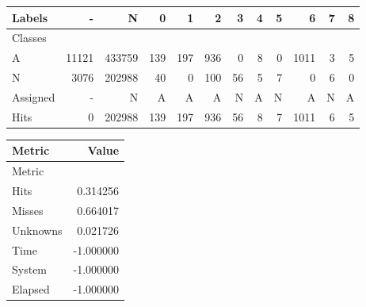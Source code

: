 \begin{tabular}{l|r|r|r|r|r|r|r|r|r|r|r}

Labels &      - &       N &    0 &    1 &    2 &   3 &  4 &  5 &     6 &  7 &  8 \\\hline
Classes  &        &         &      &      &      &     &    &    &       &    &    \\\hline
\hline
A        &  11121 &  433759 &  139 &  197 &  936 &   0 &  8 &  0 &  1011 &  3 &  5 \\\hline
N        &   3076 &  202988 &   40 &    0 &  100 &  56 &  5 &  7 &     0 &  6 &  0 \\\hline
\hline
Assigned &      - &       N &    A &    A &    A &   N &  A &  N &     A &  N &  A \\\hline
Hits     &      0 &  202988 &  139 &  197 &  936 &  56 &  8 &  7 &  1011 &  6 &  5 
\end{tabular}
\begin{tabular}{l|r}

Metric   &     Value \\\hline
Metric   &           \\\hline
\hline
Hits     &  0.314256 \\\hline
Misses   &  0.664017 \\\hline
Unknowns &  0.021726 \\\hline
Time     & -1.000000 \\\hline
System   & -1.000000 \\\hline
Elapsed  & -1.000000 
\end{tabular}
